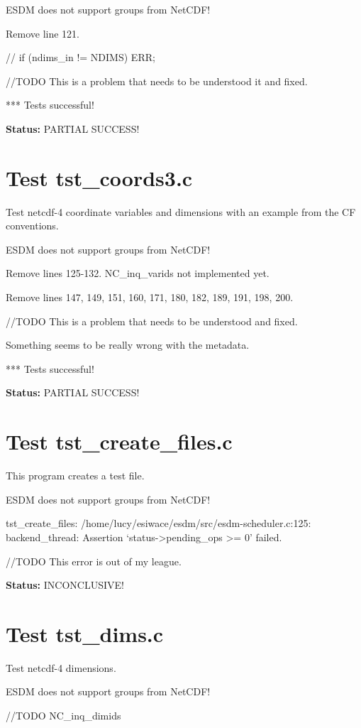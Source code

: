 ESDM does not support groups from NetCDF!

Remove line 121.

// if (ndims\_in != NDIMS) ERR;

//TODO This is a problem that needs to be understood it and fixed.

*** Tests successful!

{\bf \large Status: } PARTIAL SUCCESS!

\section{Test tst\_coords3.c}

Test netcdf-4 coordinate variables and dimensions with an example from the CF conventions.

ESDM does not support groups from NetCDF!

Remove lines 125-132. NC\_inq\_varids not implemented yet.

Remove lines 147, 149, 151, 160, 171, 180, 182, 189, 191, 198, 200.

//TODO This is a problem that needs to be understood and fixed.

Something seems to be really wrong with the metadata.

*** Tests successful!

{\bf \large Status: } PARTIAL SUCCESS!

\section{Test tst\_create\_files.c}

This program creates a test file.

ESDM does not support groups from NetCDF!

tst\_create\_files: /home/lucy/esiwace/esdm/src/esdm-scheduler.c:125: backend\_thread: Assertion `status->pending\_ops >= 0' failed.

//TODO This error is out of my league.

{\bf \large Status: } INCONCLUSIVE!

\section{Test tst\_dims.c}

Test netcdf-4 dimensions.

ESDM does not support groups from NetCDF!

//TODO NC\_inq\_dimids

